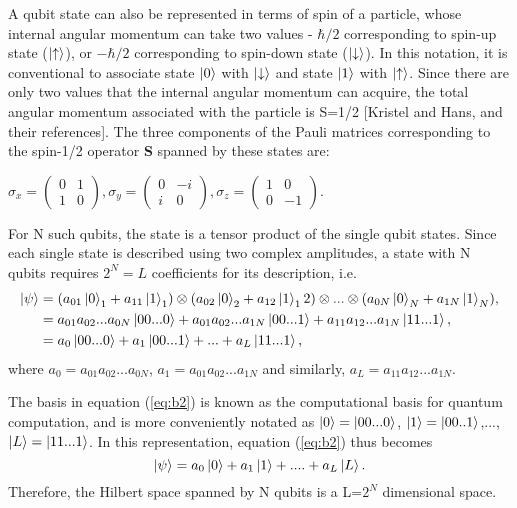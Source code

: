\documentclass[12]{article}
\begin{document}
A qubit state can also be represented in terms of spin of a particle, whose internal angular momentum can take two values - $\hbar/2$ corresponding to spin-up state ($\ket{\uparrow}$), or $-\hbar/2$ corresponding to spin-down state ($\ket{\downarrow}$). In this notation, it is conventional to associate state $\ket{0}$ with $\ket{\downarrow}$ and state $\ket{1}$ with $\ket{\uparrow}$. Since there are only two values that the internal angular momentum can acquire, the total angular momentum associated with the particle is S=1/2 [Kristel and Hans, and their references]. The three components of the Pauli matrices corresponding to the spin-1/2 operator \textbf{S} spanned by these states are:
\begin{center}
$ \sigma_x= \begin{pmatrix}
0 & 1\\
1 & 0
\end{pmatrix}, \sigma_y= \begin{pmatrix}
0 & -i\\
i & 0
\end{pmatrix}, \sigma_z= \begin{pmatrix}
1 & 0\\
0 & -1
\end{pmatrix}.
$\\
\end{center}
For N such qubits, the state is a tensor product of the single qubit states. Since each single state is described using two complex amplitudes, a state with N qubits requires $2^N=L$ coefficients for its description, i.e. 
\begin{equation}
\begin{split}
\ket{\psi} &= (a_{01}\ket{0}_1+a_{11}\ket{1}_1)\otimes(a_{02}\ket{0}_2+a_{12}\ket{1}_12)\otimes...\otimes(a_{0N}\ket{0}_N+a_{1N}\ket{1}_N),\\ 
		  &=a_{01}a_{02}...a_{0N}\ket{00...0}+a_{01}a_{02}...a_{1N}\ket{00...1}+a_{11}a_{12}...a_{1N}\ket{11...1},\\
		  &=a_0 \ket{00...0}+a_1 \ket{00...1}+...+a_L \ket{11...1},\\ \label{eq:b2}
\end{split}
\end{equation}
where $a_0=a_{01}a_{02}...a_{0N}$, $a_1=a_{01}a_{02}...a_{1N}$ and similarly, $a_L=a_{11}a_{12}...a_{1N}$.

The basis in equation (\ref{eq:b2}) is known as the computational basis for quantum computation, and is more conveniently notated as $\ket{0}=\ket{00...0}$, $\ket{1}=\ket{00..1}$,..., $\ket{L}=\ket{11...1}$. In this representation, equation (\ref{eq:b2}) thus becomes
\begin{equation}
\ket{\psi}= a_0\ket{0}+a_1\ket{1}+....+a_L\ket{L}.  \label{eq:b3}
\end{equation}
Therefore, the Hilbert space spanned by N qubits is a L=$2^N$ dimensional space.
\end{document}

